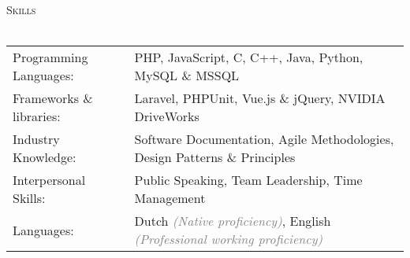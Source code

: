 \documentclass[a4paper]{article}
\newcommand{\lineunder} {
    \vspace*{-8pt} \\
    \hspace*{-18pt} \hrulefill \\
}
\newcommand{\header} [1] {
    {\hspace*{-18pt}\vspace*{6pt} \textsc{#1}}
    \vspace*{-6pt} \lineunder
}
\begin{document}
\vspace{5mm}

\header{Skills}
\vspace{2mm}
\begin{tabular}{l l}

	Programming Languages:   & PHP, JavaScript, C, C++, Java, Python, MySQL \& MSSQL
	\vspace{1mm}\\
	
    Frameworks \& libraries: & Laravel, PHPUnit, Vue.js \& jQuery, NVIDIA DriveWorks
    \vspace{1mm}\\
    
	Industry Knowledge:      & Software Documentation, Agile Methodologies, Design Patterns \& Principles
	\vspace{1mm}\\
	
	Interpersonal Skills:    & Public Speaking, Team Leadership, Time Management
	\vspace{1mm}\\
	
    Languages:               & Dutch \textcolor{gray}{\emph{(Native proficiency)}}, English \textcolor{gray}{\emph{(Professional working proficiency)}}\\
    
\end{tabular}
\vspace{2mm}

\vspace{5mm}
\end{document}
